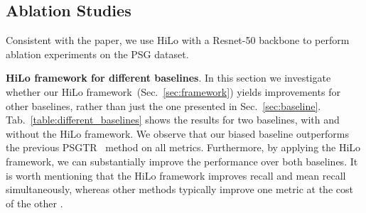 \subsection{Ablation Studies}
\label{sec:experiments:ablation}
Consistent with the paper, we use HiLo with a Resnet-50 backbone to perform ablation experiments on the PSG dataset.

\noindent \textbf{HiLo framework for different baselines}.
In this section we investigate whether our HiLo framework~(Sec.~\ref{sec:framework}) yields improvements for other baselines, rather than just the one presented in Sec.~\ref{sec:baseline}.
Tab.~\ref{table:different_baselines} shows the results for two baselines, with and without the HiLo framework.
We observe that our biased baseline outperforms the previous PSGTR~\cite{yang2022panoptic} method on all metrics.
Furthermore, by applying the HiLo framework, we can substantially improve the performance over both baselines.
It is worth mentioning that the HiLo framework improves recall and mean recall simultaneously, whereas other methods typically improve one metric at the cost of the other \cite{tang2020unbiased, yu2020cogtree}.

\begin{table}\small
    \centering
    \vspace{+1mm}
    \caption{Comparison of different baselines, with and without HiLo framework. Using the HiLo framework, we see significant improvements on both metrics.
    }
    \vspace{-2mm}
    \label{table:different_baselines}
\end{table}


